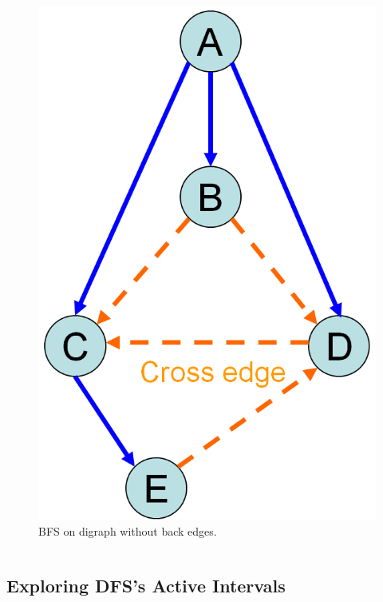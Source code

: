 \begin{frame}
\begin{columns}
    \begin{column}{0.50\textwidth}
      \begin{figure}
        \includegraphics[scale=0.30]{figure/bfs_dfs/bfsdinoback}
        \caption{{\scriptsize BFS on digraph without back edges.}}
        \label{fig:bfsdinoback}
      \end{figure}
    \end{column}
  \end{columns}

\end{frame}




\subsection{Exploring DFS's Active Intervals}


